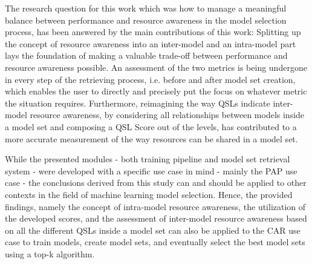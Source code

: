 The research question for this work which was how to manage a meaningful balance between performance and resource awareness in the model selection process, has been answered by the main contributions of this work: Splitting up the concept of resource awareness into an inter-model and an intra-model part lays the foundation of making a valuable trade-off between performance and resource awareness possible. An assessment of the two metrics is being undergone in every step of the retrieving process, i.e. before and after model set creation, which enables the user to directly and precisely put the focus on whatever metric the situation requires. Furthermore, reimagining the way QSLs indicate inter-model resource awareness, by considering all relationships between models inside a model set and composing a QSL Score out of the levels, has contributed to a more accurate measurement of the way resources can be shared in a model set. 

While the presented modules - both training pipeline and model set retrieval system - were developed with a specific use case in mind - mainly the PAP use case - the conclusions derived from this study can and should be applied to other contexts in the field of machine learning model selection. Hence, the provided findings, namely the concept of intra-model resource awareness, the utilization of the developed scores, and the assessment of inter-model resource awareness based on all the different QSLs inside a model set can also be applied to the CAR use case to train models, create model sets, and eventually select the best model sets using a top-k algorithm.